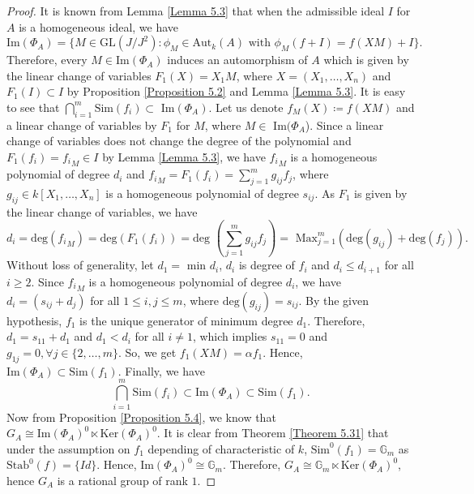 \documentclass[12pt]{amsart}
\theoremstyle{definition}
\numberwithin{equation}{section}
\begin{document}
\begin{proof}
 It is known from Lemma \ref{Lemma 5.3} that when the admissible ideal $I$ for $A$ is a homogeneous ideal, we have \[\text{Im}(\Phi_A)=\{M\in \text{GL}(J/J^2): \phi_M \in \text{Aut}_k(A) \text{ with } \phi_M(f+I)=f(XM)+I \}.\] Therefore, every $M\in\text{Im}(\Phi_A)$ induces an automorphism of $A$ which is given by the linear change of variables $F_1(X)=X_1M$, where $X=(X_1,\dots,X_n)$ and $F_1(I)\subset I$ by Proposition \ref{Proposition 5.2} and Lemma \ref{Lemma 5.3}. It is easy to see that $\bigcap_{i=1}^{m}\text{Sim}(f_i)\subset \text { Im}(\Phi_A)$. Let us denote $f_M(X)\coloneqq f(XM)$ and a linear change of variables by $F_1$ for $M$, where $M\in \text{ Im}(\Phi_A$). Since a linear change of variables does not change the degree of the polynomial and $F_1(f_i)={f_{i}}_{M}\in I$ by Lemma \ref{Lemma 5.3}, we have ${f_{i}}_M$ is a homogeneous polynomial of degree $d_i$ and ${f_{i}}_M=F_1(f_i)=\sum_{j=1}^{m}g_{ij}f_j$, where $g_{ij}\in k[X_{1},\dots,X_{n}]$ is a homogeneous polynomial of degree $s_{ij}$. As $F_1$ is given by the linear change of variables, we have
\begin{equation*}\label{eq30} 
d_i= \text{deg}({f_{i}}_{M})=\text{deg}(F_1(f_i))=\text{deg }(\sum_{j=1}^{m}g_{ij}f_j)=\text{ Max}_{j=1}^{m}(\text{deg}(g_{ij})+\text{deg}(f_j)).
 \end{equation*}
 Without loss of generality, let $d_1=\text{ min }d_i$, $d_i$ is degree of $f_i$ and $d_i
 \leq d_{i+1}$ for all $i\geq 2$. Since ${f_{i}}_M$ is a homogeneous polynomial of degree $d_i$, we have $d_i=(s_{ij}+d_j)$ for all $1\leq i,j\leq m$, where $\text{deg}(g_{ij})=s_{ij}$. By the given hypothesis, $f_1$ is the unique generator of minimum degree $d_1$. Therefore, $d_1=s_{11}+d_1$ and $d_1<d_i$ for all $i\neq 1$, which implies $s_{11}=0$ and $g_{1j}=0,\forall j\in\{2,\dots,m\}$. So, we get $f_1(XM)=\alpha f_1$. Hence, $\text{Im}(\Phi_A)\subset \text{Sim}(f_1)$. Finally, we have \[\bigcap_{i=1}^{m}\text{Sim}(f_i)\subset \text{Im}(\Phi_A)\subset \text{Sim}(f_1).\] Now from Proposition \ref{Proposition 5.4}, we know that $G_A\cong \text{Im}(\Phi_A)^{0}\ltimes \text{Ker}(\Phi_A)^{0}$. It is clear from Theorem \ref{Theorem 5.31} that under the assumption on $f_1$ depending of characteristic of $k$, $\text{Sim}^{0}(f_1)=\mathbb{G}_m$ as $\text{Stab}^{0}(f)=\{Id\}$. Hence, $\text{Im}(\Phi_A)^{0}\cong \mathbb{G}_m$. Therefore, $G_A\cong \mathbb{G}_m\ltimes \text{Ker}(\Phi_A)^{0}$, hence $G_A$ is a rational group of rank $1$. 
\end{proof}
\end{document}
